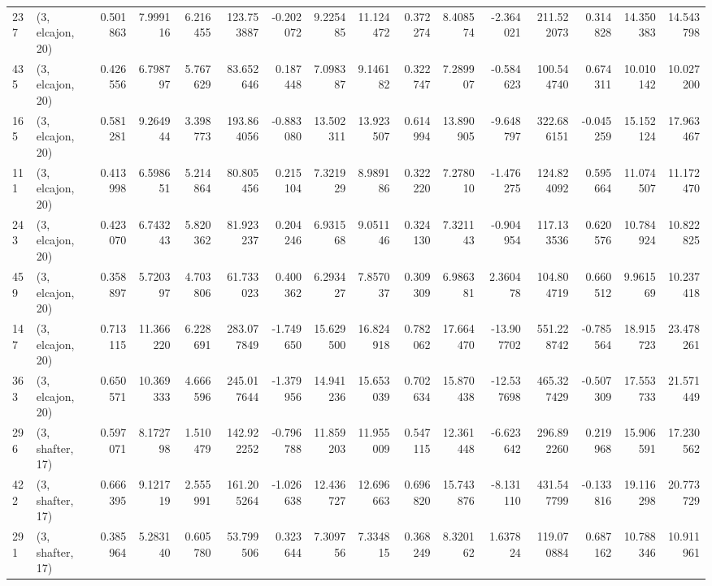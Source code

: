 \begin{tabular}{llrrrrrrrrrrrrrr}
237 &  (3, elcajon, 20) &   0.501863 &   7.999116 &   6.216455 &   123.753887 &  -0.202072 &   9.225485 &  11.124472 &  0.372274 &   8.408574 &  -2.364021 &   211.522073 &   0.314828 &  14.350383 &  14.543798 \\
435 &  (3, elcajon, 20) &   0.426556 &   6.798797 &   5.767629 &    83.652646 &   0.187448 &   7.098387 &   9.146182 &  0.322747 &   7.289907 &  -0.584623 &   100.544740 &   0.674311 &  10.010142 &  10.027200 \\
165 &  (3, elcajon, 20) &   0.581281 &   9.264944 &   3.398773 &   193.864056 &  -0.883080 &  13.502311 &  13.923507 &  0.614994 &  13.890905 &  -9.648797 &   322.686151 &  -0.045259 &  15.152124 &  17.963467 \\
111 &  (3, elcajon, 20) &   0.413998 &   6.598651 &   5.214864 &    80.805456 &   0.215104 &   7.321929 &   8.989186 &  0.322220 &   7.278010 &  -1.476275 &   124.824092 &   0.595664 &  11.074507 &  11.172470 \\
243 &  (3, elcajon, 20) &   0.423070 &   6.743243 &   5.820362 &    81.923237 &   0.204246 &   6.931568 &   9.051146 &  0.324130 &   7.321143 &  -0.904954 &   117.133536 &   0.620576 &  10.784924 &  10.822825 \\
459 &  (3, elcajon, 20) &   0.358897 &   5.720397 &   4.703806 &    61.733023 &   0.400362 &   6.293427 &   7.857037 &  0.309309 &   6.986381 &   2.360478 &   104.804719 &   0.660512 &   9.961569 &  10.237418 \\
147 &  (3, elcajon, 20) &   0.713115 &  11.366220 &   6.228691 &   283.077849 &  -1.749650 &  15.629500 &  16.824918 &  0.782062 &  17.664470 & -13.907702 &   551.228742 &  -0.785564 &  18.915723 &  23.478261 \\
363 &  (3, elcajon, 20) &   0.650571 &  10.369333 &   4.666596 &   245.017644 &  -1.379956 &  14.941236 &  15.653039 &  0.702634 &  15.870438 & -12.537698 &   465.327429 &  -0.507309 &  17.553733 &  21.571449 \\
296 &  (3, shafter, 17) &   0.597071 &   8.172798 &   1.510479 &   142.922252 &  -0.796788 &  11.859203 &  11.955009 &  0.547115 &  12.361448 &  -6.623642 &   296.892260 &   0.219968 &  15.906591 &  17.230562 \\
422 &  (3, shafter, 17) &   0.666395 &   9.121719 &   2.555991 &   161.205264 &  -1.026638 &  12.436727 &  12.696663 &  0.696820 &  15.743876 &  -8.131110 &   431.547799 &  -0.133816 &  19.116298 &  20.773729 \\
291 &  (3, shafter, 17) &   0.385964 &   5.283140 &   0.605780 &    53.799506 &   0.323644 &   7.309756 &   7.334815 &  0.368249 &   8.320162 &   1.637824 &   119.070884 &   0.687162 &  10.788346 &  10.911961 \\

\end{tabular}
